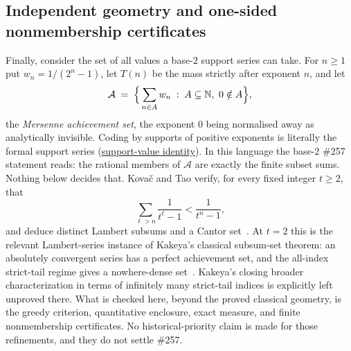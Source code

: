 \documentclass[11pt]{article}
\newcommand{\commit}{99f4bf47422abbd8757cbb22b50ba079d764d3a7}
\newcommand{\repobase}{https://github.com/wcook04/plectis-erdos/blob/\commit}
\newcommand{\PK}{Erdos249257}
\newcommand{\lword}[4]{\href{\repobase/\PK/#1\#L#2}{#4}}
\theoremstyle{definition}
\theoremstyle{remark}
\newcommand{\N}{\mathbb{N}}
\begin{document}
\subsection{Independent geometry and one-sided nonmembership certificates}
\label{app:carry-geometry}

Finally, consider the set of all values a base-$2$ support series can
take. For $n\ge1$ put $w_n=1/(2^n-1)$, let $T(n)$ be the mass strictly after
exponent $n$, and let
\[
\mathcal A\;=\;\Bigl\{\,\sum_{n\in A}w_n \;:\; A\subseteq\N,\ 0\notin A\Bigr\},
\]
the \emph{Mersenne achievement set}, the exponent $0$ being normalised away as
analytically invisible. Coding by supports of positive exponents is literally
the formal support series
(\lword{GreedyAchievementSet.lean}{554}{positiveMersenneSupportValue_eq_erdosSupportSeries}{support-value identity}). In
this language the base-$2$ \#257 statement reads: the rational members of
$\mathcal A$ are exactly the finite subset sums. Nothing below decides that.
Kova\v{c} and Tao verify, for every fixed integer $t\ge2$, that
\[
  \sum_{\ell>n}\frac1{t^\ell-1}<\frac1{t^n-1},
\]
and deduce distinct Lambert subsums and a Cantor
set~\cite[Remark~4.1, p.~13]{kovactao}. At
$t=2$ this is the relevant Lambert-series instance of Kakeya's classical
subsum-set theorem: an absolutely convergent series has a perfect achievement
set, and the all-index strict-tail regime gives a nowhere-dense
set~\cite[p.~251]{kakeya1914}.  Kakeya's closing broader characterization in
terms of infinitely many strict-tail indices is explicitly left unproved
there.  What is checked here, beyond the proved classical geometry, is the
greedy criterion, quantitative enclosure, exact measure, and finite
nonmembership certificates.  No historical-priority claim is made for those
refinements, and they do not settle \#257.
\end{document}
